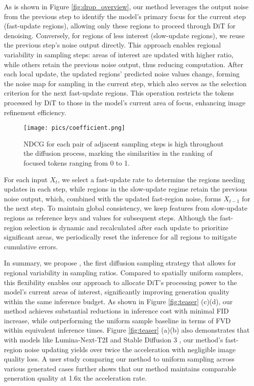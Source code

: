 As is shown in Figure \ref{fig:drop_overview}, our method leverages the output noise from the previous step to identify the model's primary focus for the current step (fast-update regions), allowing only these regions to proceed through DiT for denoising. Conversely, for regions of less interest (slow-update regions), we reuse the previous step's noise output directly. This approach enables regional variability in sampling steps: areas of interest are updated with higher ratio, while others retain the previous noise output, thus reducing computation. After each local update, the updated regions' predicted noise values change, forming the noise map for sampling in the current step, which also serves as the selection criterion for the next fast-update regions. This operation restricts the tokens processed by DiT to those in the model's current area of focus, enhancing image refinement efficiency.

\begin{figure}[htbp]
    \centering
        \texttt{[image: pics/coefficient.png]}
        \caption{NDCG \cite{dcg, wang2013theoreticalanalysisndcgtype} for each pair of adjacent sampling steps is high throughout the diffusion process, marking the similarities in the ranking of focused tokens ranging from 0 to 1. }
        \label{fig:ndcg}
\end{figure}

For each input \( X_t \), we select a fast-update rate to determine the regions needing updates in each step, while regions in the slow-update regime retain the previous noise output, which, combined with the updated fast-region noise, forms \( X_{t-1} \) for the next step. To maintain global consistency, we keep features from slow-update regions as reference keys and values for subsequent steps. Although the fast-region selection is dynamic and recalculated after each update to prioritize significant areas, we periodically reset the inference for all regions to mitigate cumulative errors.

In summary, we propose \ourmethod{}, the first diffusion sampling strategy that allows for regional variability in sampling ratios. Compared to spatially uniform samplers, this flexibility enables our approach to allocate DiT's processing power to the model's current areas of interest, significantly improving generation quality within the same inference budget. As shown in Figure \ref{fig:teaser} (c)(d), our method achieves substantial reductions in inference cost with minimal FID increase, while outperforming the uniform sample baseline in terms of FVD within equivalent inference times. Figure \ref{fig:teaser} (a)(b) also demonstrates that with models like Lumina-Next-T2I \cite{gao2024luminat2xtransformingtextmodality} and Stable Diffusion 3 \cite{esser2024sd3}, our method's fast-region noise updating yields over twice the acceleration with negligible image quality loss. A user study comparing our method to uniform sampling across various generated cases further shows that our method maintains comparable generation quality at 1.6x the acceleration rate.





